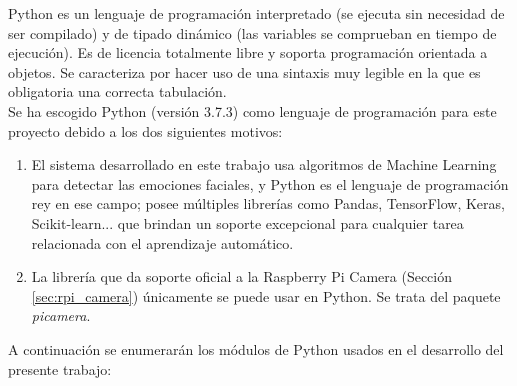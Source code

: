 Python es un lenguaje de programación interpretado (se ejecuta sin necesidad de ser compilado) y de tipado dinámico (las variables se comprueban en tiempo de ejecución). Es de licencia totalmente libre y soporta programación orientada a objetos. Se caracteriza por hacer uso de una sintaxis muy legible en la que es obligatoria una correcta tabulación.\\

Se ha escogido Python (versión 3.7.3) como lenguaje de programación para este proyecto debido a los dos siguientes motivos:

\begin{enumerate}
    \item El sistema desarrollado en este trabajo usa algoritmos de Machine Learning para detectar las emociones faciales, y Python es el lenguaje de programación rey en ese campo; posee múltiples librerías como Pandas, TensorFlow, Keras, Scikit-learn... que brindan un soporte excepcional para cualquier tarea relacionada con el aprendizaje automático.
    
    \item La librería que da soporte oficial a la Raspberry Pi Camera (Sección \ref{sec:rpi_camera}) únicamente se puede usar en Python. Se trata del paquete \textit{picamera}.
\end{enumerate}

A continuación se enumerarán los módulos de Python usados en el desarrollo del presente trabajo:

